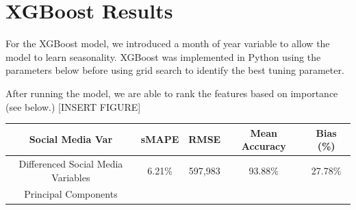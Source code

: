 \documentclass[12pt,oneside]{chicagocapstone}
\begin{document}
\section*{XGBoost Results}\label{xgboost-results}

For the XGBoost model, we introduced a month of year variable to allow
the model to learn seasonality. XGBoost was implemented in Python using
the parameters below before using grid search to identify the best
tuning parameter.

After running the model, we are able to rank the features based on
importance (see below.) {[}INSERT FIGURE{]}
\begin{longtable}[]{@{}ccccc@{}}
\toprule
\begin{minipage}[b]{0.27\columnwidth}\centering\strut
Social Media Var\strut
\end{minipage} & \begin{minipage}[b]{0.13\columnwidth}\centering\strut
sMAPE\strut
\end{minipage} & \begin{minipage}[b]{0.14\columnwidth}\centering\strut
RMSE\strut
\end{minipage} & \begin{minipage}[b]{0.16\columnwidth}\centering\strut
Mean Accuracy\strut
\end{minipage} & \begin{minipage}[b]{0.16\columnwidth}\centering\strut
Bias (\%)\strut
\end{minipage}\tabularnewline
\midrule
\endhead
\begin{minipage}[t]{0.27\columnwidth}\centering\strut
Differenced Social Media Variables\strut
\end{minipage} & \begin{minipage}[t]{0.13\columnwidth}\centering\strut
6.21\%\strut
\end{minipage} & \begin{minipage}[t]{0.14\columnwidth}\centering\strut
597,983\strut
\end{minipage} & \begin{minipage}[t]{0.16\columnwidth}\centering\strut
93.88\%\strut
\end{minipage} & \begin{minipage}[t]{0.16\columnwidth}\centering\strut
27.78\%\strut
\end{minipage}\tabularnewline
\begin{minipage}[t]{0.27\columnwidth}\centering\strut
Principal Components\strut

\end{minipage}
\end{longtable}
\end{document}
